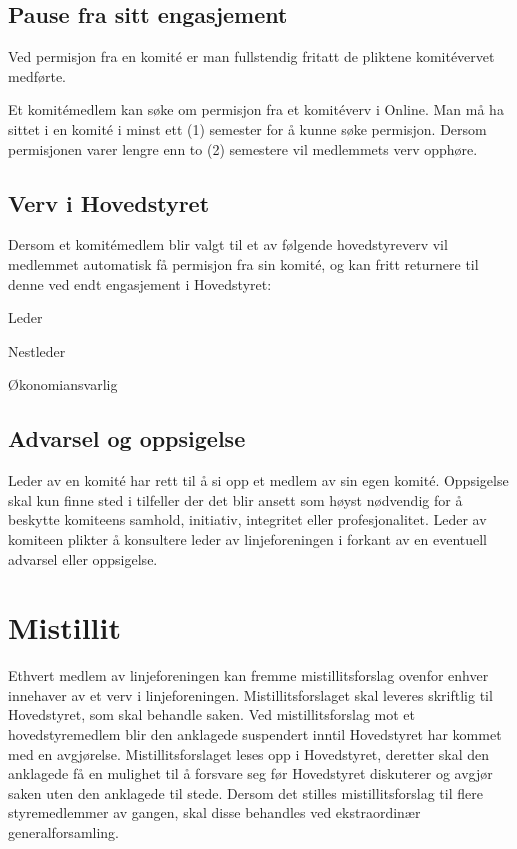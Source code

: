 \subsection{Pause fra sitt engasjement}{
Ved permisjon fra en komité er man fullstendig fritatt de pliktene komitévervet medførte.

Et komitémedlem kan søke om permisjon fra et komitéverv i Online. Man må ha sittet i en komité i minst ett (1) semester for å kunne søke permisjon. Dersom permisjonen varer lengre enn to (2) semestere vil medlemmets verv opphøre.
}

\subsection{Verv i Hovedstyret}{
Dersom et komitémedlem blir valgt til et av følgende hovedstyreverv vil medlemmet automatisk få permisjon fra sin komité, og kan fritt \linebreak returnere til denne ved endt engasjement i Hovedstyret:
\begin{liste}
	\item Leder
	\item Nestleder
	\item Økonomiansvarlig
\end{liste}
}

\subsection{Advarsel og oppsigelse}{
Leder av en komité har rett til å si opp et medlem av sin egen komité. Oppsigelse skal kun finne sted i tilfeller der det blir ansett som høyst nødvendig for å beskytte komiteens samhold, initiativ, integritet eller profesjonalitet. Leder av komiteen plikter å konsultere leder av linjeforeningen i forkant av en eventuell advarsel eller oppsigelse.
}

\section{Mistillit}
\vspace{23pt}

Ethvert medlem av linjeforeningen kan fremme mistillitsforslag ovenfor enhver innehaver av et verv i linjeforeningen. Mistillitsforslaget skal leveres skriftlig til Hovedstyret, som skal behandle saken. Ved mistillitsforslag mot et hovedstyremedlem blir den anklagede suspendert inntil Hovedstyret har kommet med en avgjørelse. Mistillitsforslaget leses opp i Hovedstyret, deretter skal den anklagede få en mulighet til å forsvare seg før Hovedstyret diskuterer og avgjør saken uten den anklagede til stede. Dersom det stilles mistillitsforslag til flere styremedlemmer av gangen, skal disse behandles ved ekstraordinær generalforsamling.


